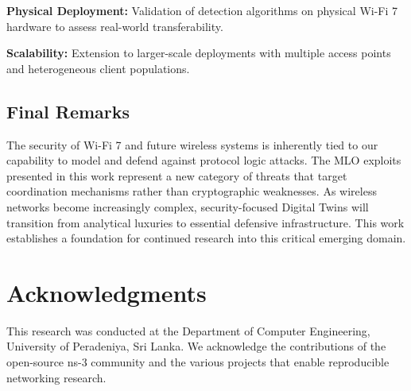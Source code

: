 \documentclass[conference]{IEEEtran}
\begin{document}
\textbf{Physical Deployment:} Validation of detection algorithms on physical Wi-Fi 7 hardware to assess real-world transferability.

\textbf{Scalability:} Extension to larger-scale deployments with multiple access points and heterogeneous client populations.

\subsection{Final Remarks}

The security of Wi-Fi 7 and future wireless systems is inherently tied to our capability to model and defend against protocol logic attacks. The MLO exploits presented in this work represent a new category of threats that target coordination mechanisms rather than cryptographic weaknesses. As wireless networks become increasingly complex, security-focused Digital Twins will transition from analytical luxuries to essential defensive infrastructure. This work establishes a foundation for continued research into this critical emerging domain.

\section*{Acknowledgments}

This research was conducted at the Department of Computer Engineering, University of Peradeniya, Sri Lanka. We acknowledge the contributions of the open-source ns-3 community and the various projects that enable reproducible networking research.
\end{document}
